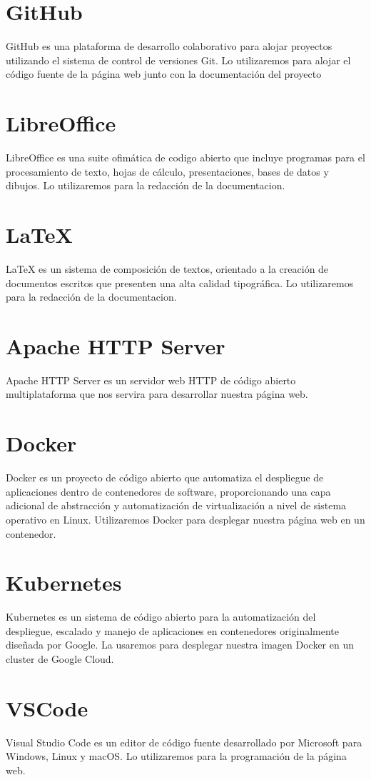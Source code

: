 \documentclass{report}
\begin{document}
        \section*{GitHub}
            GitHub es una plataforma de desarrollo colaborativo para alojar proyectos utilizando el sistema de control de versiones Git. Lo utilizaremos para alojar el código fuente de la página web junto con la documentación del proyecto
        \section*{LibreOffice}
            LibreOffice es una suite ofimática de codigo abierto que incluye programas para el procesamiento de texto, hojas de cálculo, presentaciones, bases de datos y dibujos. Lo utilizaremos para la redacción de la documentacion.
        \section*{LaTeX}
            LaTeX es un sistema de composición de textos, orientado a la creación de documentos escritos que presenten una alta calidad tipográfica. Lo utilizaremos para la redacción de la documentacion.
        \section*{Apache HTTP Server}
            Apache HTTP Server es un servidor web HTTP de código abierto multiplataforma que nos servira para desarrollar nuestra página web.
        \section*{Docker}
            Docker es un proyecto de código abierto que automatiza el despliegue de aplicaciones dentro de contenedores de software, proporcionando una capa adicional de abstracción y automatización de virtualización a nivel de sistema operativo en Linux. Utilizaremos Docker para desplegar nuestra página web en un contenedor.
        \section*{Kubernetes}
            Kubernetes es un sistema de código abierto para la automatización del despliegue, escalado y manejo de aplicaciones en contenedores originalmente diseñada por Google. La usaremos para desplegar nuestra imagen Docker en un cluster de Google Cloud.
        \section*{VSCode}
            Visual Studio Code es un editor de código fuente desarrollado por Microsoft para Windows, Linux y macOS. Lo utilizaremos para la programación de la página web.
\end{document}
